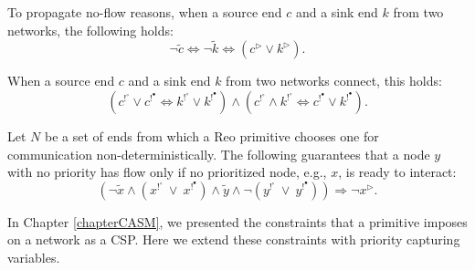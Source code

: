 \begin{BehAxiom}\label{ax:mixednode}
To propagate no-flow reasons, when a source end $c$ and a sink end $k$ from two networks, the following holds:
$$ \neg \tilde{c} \Leftrightarrow \neg \tilde{k} \Leftrightarrow  ({c}^\triangleright \vee {k}^\triangleright).$$
\end{BehAxiom}

\begin{BehAxiom}\label{ax:joinprio}
When a source end $c$ and a sink end $k$ from two networks connect, this holds:
$$(c^{!^\circ}\vee c^{!^\bullet} \Leftrightarrow k^{!^\circ}\vee k^{!^\bullet}) \wedge (c^{!^\circ}\wedge k^{!^\circ} \Leftrightarrow c^{!^\bullet}\vee k^{!^\bullet}).$$
\end{BehAxiom}
%
%

\begin{BehAxiom}\label{ax:chooserprio}
Let $N$ be a set of ends from which a Reo primitive chooses one for communication non-deterministically. %
The following guarantees that a node $y$ with no priority has flow only if no prioritized node, e.g., $x$, is ready to interact: 
$$(\neg \tilde{x} \wedge (x^{!^\circ}\ \vee\ x^{!^\bullet}) \wedge \tilde{y} \wedge \neg (y^{!^\circ}\ \vee\ y^{!^\bullet})) \Rightarrow \neg x^\triangleright .$$
\end{BehAxiom}



In Chapter \ref{chapterCASM}, we presented the constraints that a primitive imposes on a network as a CSP. Here we extend these constraints with priority capturing variables. 

